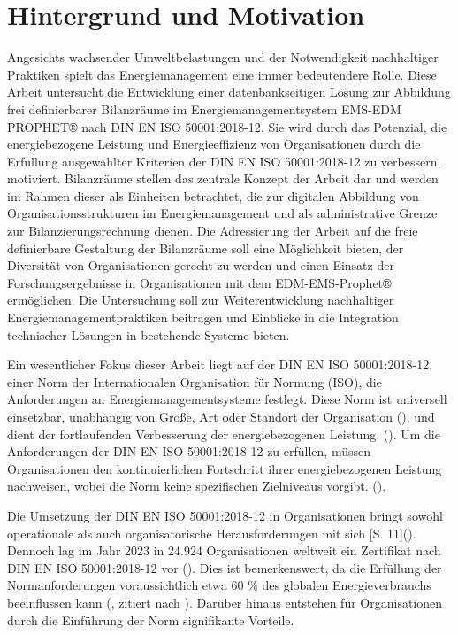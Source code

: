 \section{Hintergrund und Motivation}
Angesichts wachsender Umweltbelastungen und der Notwendigkeit nachhaltiger Praktiken spielt das Energiemanagement eine immer bedeutendere Rolle.
Diese Arbeit untersucht die Entwicklung einer datenbankseitigen Lösung zur Abbildung frei definierbarer Bilanzräume im Energiemanagementsystem
EMS-EDM PROPHET® nach DIN EN ISO 50001:2018-12.
Sie wird durch das Potenzial, die energiebezogene Leistung und Energieeffizienz von Organisationen durch die Erfüllung ausgewählter Kriterien 
der DIN EN ISO 50001:2018-12 zu verbessern, motiviert. 
Bilanzräume stellen das zentrale Konzept der Arbeit dar und werden im Rahmen dieser als Einheiten betrachtet, die zur digitalen Abbildung 
von Organisationsstrukturen im Energiemanagement und als administrative Grenze zur Bilanzierungsrechnung dienen.
Die Adressierung der Arbeit auf die freie definierbare Gestaltung der Bilanzräume soll eine Möglichkeit bieten, der Diversität von Organisationen gerecht zu werden
und einen Einsatz der Forschungsergebnisse in Organisationen mit dem EDM-EMS-Prophet® ermöglichen.
Die Untersuchung soll zur Weiterentwicklung nachhaltiger Energiemanagementpraktiken beitragen und Einblicke in die Integration
technischer Lösungen in bestehende Systeme bieten.

Ein wesentlicher Fokus dieser Arbeit liegt auf der DIN EN ISO 50001:2018-12, einer Norm der Internationalen Organisation für Normung (ISO),
die Anforderungen an Energiemanagementsysteme festlegt. Diese Norm ist universell einsetzbar, unabhängig von Größe, Art oder Standort der Organisation (\cite[S. 10]{DIN50001.2018}),
und dient der fortlaufenden Verbesserung der energiebezogenen Leistung. (\cite[S. 7]{DIN50001.2018}).
Um die Anforderungen der DIN EN ISO 50001:2018-12 zu erfüllen, müssen Organisationen den kontinuierlichen Fortschritt ihrer energiebezogenen Leistung nachweisen, wobei
die Norm keine spezifischen Zielniveaus vorgibt. (\cite[S. 10]{DIN50001.2018}).

Die Umsetzung der DIN EN ISO 50001:2018-12 in Organisationen bringt sowohl operationale als auch organisatorische Herausforderungen mit sich [S. 11](\cite{Marimon.2017}).
Dennoch lag im Jahr 2023 in 24.924 Organisationen weltweit ein Zertifikat nach DIN EN ISO 50001:2018-12 vor (\cite{InternationalOrganizationforStandardization.2023}).
Dies ist bemerkenswert, da die Erfüllung der Normanforderungen voraussichtlich etwa 60 \% des globalen Energieverbrauchs beeinflussen
kann (\cite{InternationalOrganizationforStandardization.2011}, zitiert nach \cite[S. 1]{Marimon.2017}). Darüber hinaus entstehen für Organisationen durch
die Einführung der Norm signifikante Vorteile.

